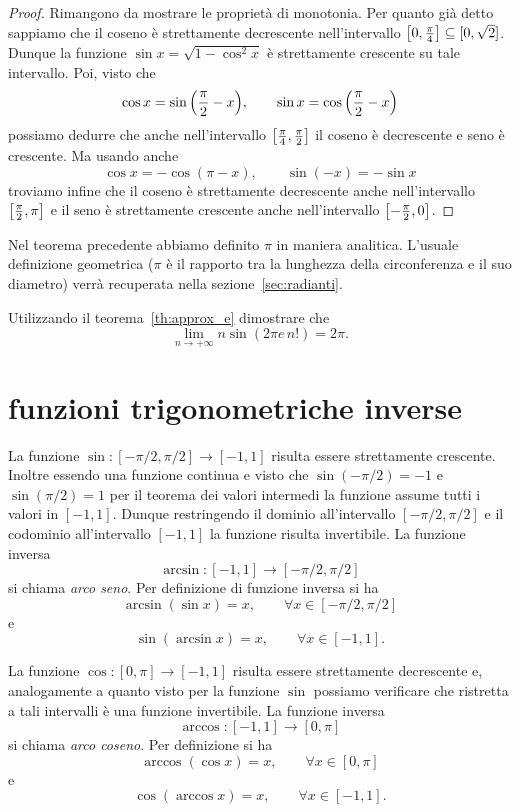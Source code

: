 \begin{proof}
Rimangono da mostrare le proprietà di monotonia.
Per quanto già detto sappiamo
che il coseno è strettamente
decrescente nell'intervallo
${\left[ 0,\frac \pi 4 \right]}\subseteq [0,\sqrt 2]$.
Dunque la funzione $\sin x = \sqrt{1-\cos^2 x}$
è strettamente crescente su tale intervallo.
Poi, visto che
\[
 \cos x  = \sin{\left( \frac \pi 2 - x \right)},
 \qquad
 \sin x = \cos{\left( \frac \pi 2 - x \right)}
\]
possiamo dedurre che anche nell'intervallo
${\left[ \frac \pi 4, \frac \pi 2 \right]}$
il coseno è decrescente e seno è crescente.
Ma usando anche
\[
\cos x = -\cos(\pi-x), \qquad \sin(-x)=-\sin x
\]
troviamo infine che il coseno è strettamente
decrescente anche
nell'intervallo ${\left[ \frac \pi 2, \pi \right]}$
e il seno è strettamente crescente anche
nell'intervallo ${\left[ -\frac \pi 2, 0 \right]}$.
\end{proof}

Nel teorema precedente abbiamo definito $\pi$ in maniera analitica.
L'usuale definizione geometrica ($\pi$ è il rapporto tra la lunghezza della
circonferenza e il suo diametro) verrà recuperata nella sezione~\ref{sec:radianti}.

\begin{exercise}
  Utilizzando il teorema~\ref{th:approx_e} dimostrare che
  \[
  \lim_{n\to +\infty} n \sin(2\pi e\, n!) = 2\pi.
  \]
\end{exercise}


\section{funzioni trigonometriche inverse}
La funzione $\sin\colon[-\pi/2,\pi/2]\to [-1,1]$ risulta essere strettamente crescente. Inoltre essendo una funzione continua e visto che $\sin(-\pi/2)=-1$
e $\sin(\pi/2) = 1$ per il  teorema dei valori intermedi
la funzione assume tutti i valori in $[-1,1]$.
Dunque restringendo il dominio all'intervallo $[-\pi/2, \pi/2]$
e il codominio all'intervallo $[-1,1]$ la funzione risulta invertibile.
La funzione inversa
\[
  \arcsin\colon[-1,1]\to [-\pi/2, \pi/2]
\]
si chiama \emph{arco seno}. Per definizione di funzione inversa si ha
\[
  \arcsin(\sin x) = x, \qquad \forall x \in [-\pi/2, \pi/2]
\]
e
\[
  \sin(\arcsin x) = x, \qquad \forall x \in [-1, 1].
\]

La funzione $\cos \colon[0,\pi] \to [-1,1]$ risulta essere strettamente
decrescente e, analogamente a quanto visto per la funzione $\sin$
possiamo verificare che ristretta a tali intervalli è una funzione invertibile.
La funzione inversa
\[
  \arccos\colon[-1,1] \to [0,\pi]
\]
si chiama \emph{arco coseno}. Per definizione si ha
\[
  \arccos(\cos x) = x, \qquad \forall x \in [0,\pi]
\]
e
\[
   \cos(\arccos x) = x, \qquad \forall x \in [-1,1].
\]

